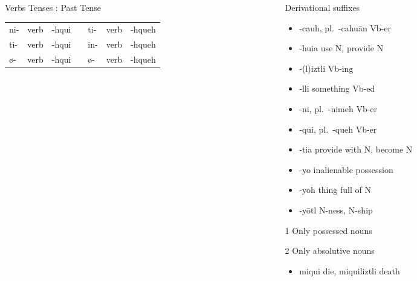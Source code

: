 \documentclass[12pt]{beamer}
\newcommand{\nah}[1]{\textcolor{nahgrn}{#1}}
\newcommand{\trs}[1]{\textcolor{nahblu}{#1}}
\begin{document}
\begin{frame}
\begin{columns}[t]
\begin{column}{.26\linewidth}
\begin{block}{Verbs Tenses : Past Tense}
\begin{enumerate}
\begin{tabular}[t]{lllllll}
      			\nah{ni-}   & verb & \trs{-hqui}   & \vline & \nah{ti-}   & verb & \trs{-hqueh} \\
      			\nah{ti-}   & verb & \trs{-hqui}   & \vline & \nah{in-}   & verb & \trs{-hqueh} \\
      			\nah{ø-}    & verb & \trs{-hqui}   & \vline & \nah{ø-}    & verb & \trs{-hqueh} \\
      		\end{tabular}%
      	\end{enumerate}
      \end{block}
    \end{column}

    \begin{column}{.20\linewidth}
      \begin{block}{Derivational suffixes}
      	\begin{threeparttable}
      		\begin{itemize}
      			\item \nah{-cauh}, pl.~\nah{-cahuān}  \trs{Vb-er}
      			\item \nah{-huia} \trs{use N, provide N}
      			\item \nah{-(l)iztli} \trs{Vb-ing}
      			\item \nah{-lli} \trs{something Vb-ed}
      			\item \nah{-ni}, pl.~\nah{-nimeh}  \trs{Vb-er}
      			\item \nah{-qui}, pl.~\nah{-queh}  \trs{Vb-er}
      			\item \nah{-tia} \trs{provide with N, become N}
      			\item \nah{-yo} inalienable possession
      			\item \nah{-yoh} \trs{thing full of N}
      			\item \nah{-yōtl} \trs{N-ness, N-ship}
      		\end{itemize}
      		\begin{tablenotes}
      			\item[1] Only possessed nouns
      			\item[2] Only absolutive nouns
      		\end{tablenotes}
      	\end{threeparttable}
      \end{block}
      \begin{example}
      	\begin{itemize}
      		\item \nah{miqui} \trs{die}, \nah{miquiliztli} \trs{death}

\end{itemize}
\end{example}
\end{column}
\end{columns}
\end{frame}
\end{document}
